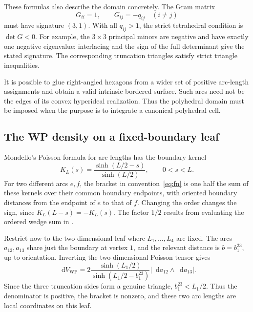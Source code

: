 \documentclass[11pt,a4paper]{article}
\numberwithin{equation}{section}
\theoremstyle{definition}
\theoremstyle{remark}
\newcommand{\dd}{\mathop{}\!\mathrm d}
\newcommand{\WP}{\mathrm{WP}}
\newcommand{\dV}{\dd V_{\WP}}
\newcommand{\abs}[1]{\left|#1\right|}
\begin{document}
These formulas also describe the domain concretely. The Gram matrix
\begin{equation}
 G_{ii}=1,\qquad G_{ij}=-q_{ij}\quad(i\ne j)
 \label{eq:gram}
\end{equation}
must have signature $(3,1)$. With all $q_{ij}>1$, the strict tetrahedral
condition is $\det G<0$. For example, the $3\times3$ principal minors are
negative and have exactly one negative eigenvalue; interlacing and the sign
of the full determinant give the stated signature. The corresponding
truncation triangles satisfy strict triangle inequalities.

It is possible to glue right-angled hexagons from a wider set of positive
arc-length assignments and obtain a valid intrinsic bordered surface. Such
arcs need not be the edges of its convex hyperideal realization. Thus the
polyhedral domain must be imposed when the purpose is to integrate a
canonical polyhedral cell.

\subsection{The WP density on a fixed-boundary leaf}

Mondello's Poisson formula for arc lengths has the boundary kernel
\begin{equation}
 K_L(s)=\frac{\sinh(L/2-s)}{\sinh(L/2)},\qquad 0<s<L.
 \label{eq:boundarykernel}
\end{equation}
For two different arcs $e,f$, the bracket in convention~\eqref{eq:fn} is
one half the sum of these kernels over their common boundary endpoints,
with oriented boundary distances from the endpoint of $e$ to that of $f$.
Changing the order changes the sign, since $K_L(L-s)=-K_L(s)$.
The factor $1/2$ results from evaluating the ordered wedge sum in
\cite[Theorem 4.1]{MondelloBoundary}.

Restrict now to the two-dimensional leaf where $L_1,\ldots,L_4$ are fixed.
The arcs $a_{12},a_{13}$ share just the boundary at vertex $1$, and the
relevant distance is $b=b_1^{23}$, up to orientation. Inverting the
two-dimensional Poisson tensor gives
\begin{equation}
 \boxed{
 \dV=
 2\frac{\sinh(L_1/2)}{\sinh(L_1/2-b_1^{23})}
 \abs{\dd a_{12}\wedge\dd a_{13}}.}
 \label{eq:hyperidealdensity}
\end{equation}
Since the three truncation sides form a genuine triangle,
$b_1^{23}<L_1/2$. Thus the denominator is positive, the bracket is nonzero,
and these two arc lengths are local coordinates on this leaf.
\end{document}
